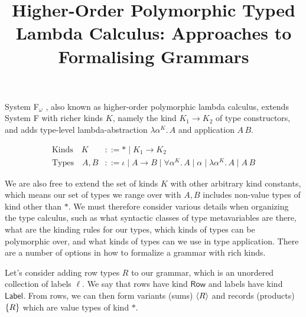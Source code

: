 \documentclass[acmsmall, 9pt]{article}
\begin{document}
\pagestyle{empty}

\title{Higher-Order Polymorphic Typed Lambda Calculus: Approaches to Formalising Grammars}

\maketitle
\noindent
System F$_\omega$ \cite{cambridge-lambda-calc, pierce2002types}, also known as higher-order polymorphic lambda calculus, extends System F with richer kinds $K$, namely the kind $K_1 \rightarrow K_2$ of type constructors, and adds type-level lambda-abstraction $\lambda \alpha^K. \, A$ and application $A\,B$.

\begin{align*}
  \text{Kinds} \quad K &::= * \; | \; K_1 \rightarrow K_2\\
  \text{Types} \quad  A, B &::= \iota \; | \;  A \rightarrow B \; | \; \forall \alpha^K . \, A\; | \; \alpha \; | \; \lambda \alpha^K. \, A \; | \; A \, B
\end{align*}

We are also free to extend the set of kinds $K$ with other arbitrary kind constants, which means our set of types we range over with $A, B$ includes non-value types of kind other than $*$. We must therefore consider various details when organizing the type calculus, such as what syntactic classes of type metavariables are there, what are the kinding rules for our types, which kinds of types can be polymorphic over, and what kinds of types can we use in type application. There are a number of options in how to formalize a grammar with rich kinds.

Let's consider adding row types $R$ to our grammar, which is an unordered collection of labels $\ell$. We say that rows have kind $\mathsf{Row}$ and labels have kind $\mathsf{Label}$. From rows, we can then form variants (sums) $\langle R \rangle$ and records (products) $\{ R \}$ which are value types of kind $*$.
\end{document}
